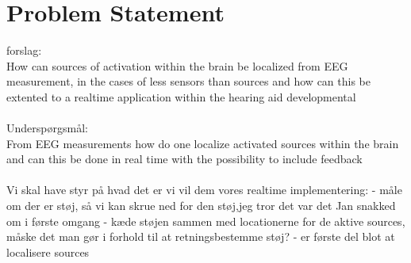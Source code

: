 \chapter{Problem Statement}
forslag:\\
How can sources of activation within the brain be localized from EEG measurement, in the cases of less sensors than sources and how can this be extented to a realtime application within the hearing aid developmental\\
\\

Underspørgsmål:\\




From EEG measurements how do one localize activated sources within the brain and can this be done in real time with the possibility to include feedback 
\\ \\



Vi skal have styr på hvad det er vi vil dem vores realtime implementering: 
- måle om der er støj, så vi kan skrue ned for den støj,jeg tror det var det Jan snakked om i første omgang 
- kæde støjen sammen med locationerne for de aktive sources, måske det man gør i forhold til at retningsbestemme støj? 
- er første del blot at localisere sources  

 